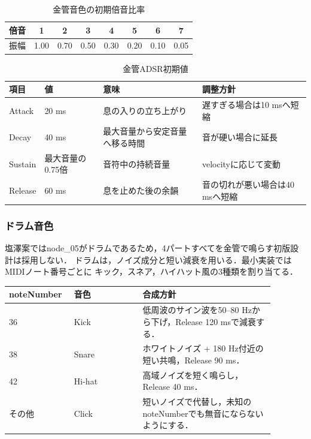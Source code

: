 \documentclass[a4paper,11pt]{jsarticle}
\begin{document}
\begin{table}[h]
\centering
\caption{金管音色の初期倍音比率}
\begin{tabular}{cccccccc}
\toprule
倍音 & 1 & 2 & 3 & 4 & 5 & 6 & 7 \\
\midrule
振幅 & 1.00 & 0.70 & 0.50 & 0.30 & 0.20 & 0.10 & 0.05 \\
\bottomrule
\end{tabular}
\end{table}

\begin{table}[h]
\centering
\caption{金管ADSR初期値}
\begin{tabular}{llll}
\toprule
項目 & 値 & 意味 & 調整方針 \\
\midrule
Attack & 20 ms & 息の入りの立ち上がり & 遅すぎる場合は10 msへ短縮 \\
Decay & 40 ms & 最大音量から安定音量へ移る時間 & 音が硬い場合に延長 \\
Sustain & 最大音量の0.75倍 & 音符中の持続音量 & velocityに応じて変動 \\
Release & 60 ms & 息を止めた後の余韻 & 音の切れが悪い場合は40 msへ短縮 \\
\bottomrule
\end{tabular}
\end{table}

\subsubsection{ドラム音色}

塩澤案ではnode\_05がドラムであるため，4パートすべてを金管で鳴らす初版設計は採用しない．
ドラムは，ノイズ成分と短い減衰を用いる．最小実装ではMIDIノート番号ごとに
キック，スネア，ハイハット風の3種類を割り当てる．

\begin{longtable}{p{0.18\linewidth}p{0.24\linewidth}p{0.46\linewidth}}
\toprule
noteNumber & 音色 & 合成方針 \\
\midrule
\endhead
36 & Kick & 低周波のサイン波を50--80 Hzから下げ，Release 120 msで減衰する． \\
38 & Snare & ホワイトノイズ + 180 Hz付近の短い共鳴，Release 90 ms． \\
42 & Hi-hat & 高域ノイズを短く鳴らし，Release 40 ms． \\
その他 & Click & 短いノイズで代替し，未知のnoteNumberでも無音にならないようにする． \\
\bottomrule
\end{longtable}
\end{document}
